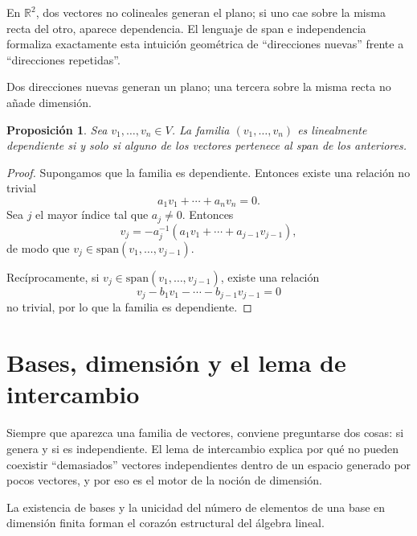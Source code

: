 \documentclass[10pt,a4paper,oneside]{article}
\theoremstyle{plain}
\newtheorem{proposition}[theorem]{Proposición}
\theoremstyle{definition}
\theoremstyle{remark}
\newcommand{\R}{\mathbb{R}}
\newcommand{\Span}{\mathrm{span}}
\begin{document}
\begin{intuitionBox}
En \(\R^2\), dos vectores no colineales generan el plano; si uno cae sobre la misma recta del otro, aparece dependencia. El lenguaje de span e independencia formaliza exactamente esta intuición geométrica de ``direcciones nuevas'' frente a ``direcciones repetidas''.
\end{intuitionBox}

\begin{center}

{\small Dos direcciones nuevas generan un plano; una tercera sobre la misma recta no añade dimensión.}
\end{center}

\begin{proposition}
Sea \(v_1,\dots,v_n\in V\). La familia \((v_1,\dots,v_n)\) es linealmente dependiente si y solo si alguno de los vectores pertenece al span de los anteriores.
\end{proposition}

\begin{proof}
Supongamos que la familia es dependiente. Entonces existe una relación no trivial
\[
a_1v_1+\cdots+a_nv_n=0.
\]
Sea \(j\) el mayor índice tal que \(a_j\neq 0\). Entonces
\[
v_j=-a_j^{-1}(a_1v_1+\cdots+a_{j-1}v_{j-1}),
\]
de modo que \(v_j\in\Span(v_1,\dots,v_{j-1})\).

Recíprocamente, si \(v_j\in\Span(v_1,\dots,v_{j-1})\), existe una relación
\[
v_j-b_1v_1-\cdots-b_{j-1}v_{j-1}=0
\]
no trivial, por lo que la familia es dependiente. \end{proof}

\section{Bases, dimensión y el lema de intercambio}
\begin{methodBox}
Siempre que aparezca una familia de vectores, conviene preguntarse dos cosas: si genera y si es independiente. El lema de intercambio explica por qué no pueden coexistir ``demasiados'' vectores independientes dentro de un espacio generado por pocos vectores, y por eso es el motor de la noción de dimensión.
\end{methodBox}
La existencia de bases y la unicidad del número de elementos de una base en dimensión finita forman el corazón estructural del álgebra lineal.
\end{document}
